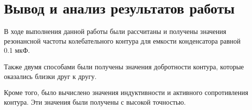 \section{Вывод и анализ результатов работы}
В ходе выполнения данной работы были рассчитаны и получены
значения резонансной частоты колебательного контура для емкости
конденсатора равной 0.1 мкФ.

Также двумя способами были получены значения добротности контура,
которые оказались близки друг к другу.

Кроме того, было вычислено значения индуктивности и
активного сопротивления контура.
Эти значения были получены с высокой точностью.
